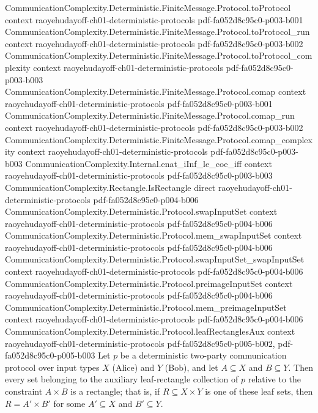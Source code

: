 \begin{lemma}
  {CommunicationComplexity.Deterministic.FiniteMessage.Protocol.toProtocol}
  {context}
  {raoyehudayoff-ch01-deterministic-protocols}
  {pdf-fa052d8c95c0-p003-b001}
\proofstep
  {CommunicationComplexity.Deterministic.FiniteMessage.Protocol.toProtocol_run}
  {context}
  {raoyehudayoff-ch01-deterministic-protocols}
  {pdf-fa052d8c95c0-p003-b002}
\proofstep
  {CommunicationComplexity.Deterministic.FiniteMessage.Protocol.toProtocol_complexity}
  {context}
  {raoyehudayoff-ch01-deterministic-protocols}
  {pdf-fa052d8c95c0-p003-b003}
\proofstep
  {CommunicationComplexity.Deterministic.FiniteMessage.Protocol.comap}
  {context}
  {raoyehudayoff-ch01-deterministic-protocols}
  {pdf-fa052d8c95c0-p003-b001}
\proofstep
  {CommunicationComplexity.Deterministic.FiniteMessage.Protocol.comap_run}
  {context}
  {raoyehudayoff-ch01-deterministic-protocols}
  {pdf-fa052d8c95c0-p003-b002}
\proofstep
  {CommunicationComplexity.Deterministic.FiniteMessage.Protocol.comap_complexity}
  {context}
  {raoyehudayoff-ch01-deterministic-protocols}
  {pdf-fa052d8c95c0-p003-b003}
\proofstep
  {CommunicationComplexity.Internal.enat_iInf_le_coe_iff}
  {context}
  {raoyehudayoff-ch01-deterministic-protocols}
  {pdf-fa052d8c95c0-p003-b003}
\proofstep
  {CommunicationComplexity.Rectangle.IsRectangle}
  {direct}
  {raoyehudayoff-ch01-deterministic-protocols}
  {pdf-fa052d8c95c0-p004-b006}
\proofstep
  {CommunicationComplexity.Deterministic.Protocol.swapInputSet}
  {context}
  {raoyehudayoff-ch01-deterministic-protocols}
  {pdf-fa052d8c95c0-p004-b006}
\proofstep
  {CommunicationComplexity.Deterministic.Protocol.mem_swapInputSet}
  {context}
  {raoyehudayoff-ch01-deterministic-protocols}
  {pdf-fa052d8c95c0-p004-b006}
\proofstep
  {CommunicationComplexity.Deterministic.Protocol.swapInputSet_swapInputSet}
  {context}
  {raoyehudayoff-ch01-deterministic-protocols}
  {pdf-fa052d8c95c0-p004-b006}
\proofstep
  {CommunicationComplexity.Deterministic.Protocol.preimageInputSet}
  {context}
  {raoyehudayoff-ch01-deterministic-protocols}
  {pdf-fa052d8c95c0-p004-b006}
\proofstep
  {CommunicationComplexity.Deterministic.Protocol.mem_preimageInputSet}
  {context}
  {raoyehudayoff-ch01-deterministic-protocols}
  {pdf-fa052d8c95c0-p004-b006}
\proofstep
  {CommunicationComplexity.Deterministic.Protocol.leafRectanglesAux}
  {context}
  {raoyehudayoff-ch01-deterministic-protocols}
  {pdf-fa052d8c95c0-p005-b002,
    pdf-fa052d8c95c0-p005-b003}
Let $p$ be a deterministic two-party communication protocol over input types $X$ (Alice)
and $Y$ (Bob), and let $A \subseteq X$ and $B \subseteq Y$. Then every set belonging to
the auxiliary leaf-rectangle collection of $p$ relative to the constraint $A \times B$
is a rectangle; that is, if $R \subseteq X \times Y$ is one of these leaf sets, then $R
= A' \times B'$ for some $A' \subseteq X$ and $B' \subseteq Y$.
\end{lemma}

